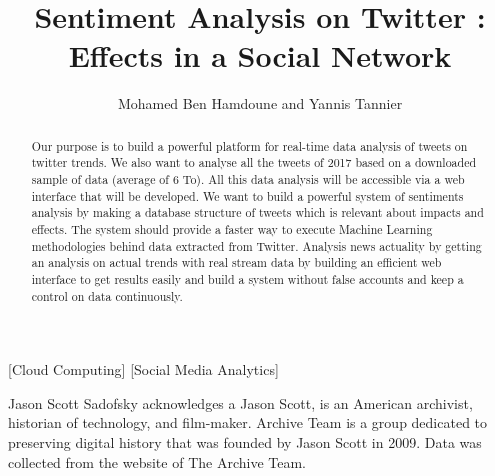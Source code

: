 \documentclass{acmtog} %
\begin{document}

\title{Sentiment Analysis on Twitter : Effects in a Social Network} %

\author{Mohamed Ben Hamdoune {\upshape and} Yannis Tannier
}

[Cloud Computing]
[Social Media Analytics]




\maketitle

\begin{bottomstuff}
Jason Scott Sadofsky acknowledges a Jason Scott, is an American archivist, historian of technology, and film-maker. Archive Team is a group dedicated to preserving digital history that was founded by Jason Scott in 2009. Data was collected from the website of The Archive Team.

\end{bottomstuff}


\begin{abstract}

Our purpose is to build a powerful platform for real-time data analysis of tweets on twitter trends. We also want to analyse all the tweets of 2017 based on a downloaded sample of data (average of 6 To). All this data analysis will be accessible via a web interface that will be developed. We want to build a powerful system of sentiments analysis by making a database structure of tweets which is relevant about impacts and effects. The system should provide a faster way to execute Machine Learning methodologies behind data extracted from Twitter. Analysis news actuality by getting an analysis on actual trends with real stream data by building an efficient web interface to get results easily and build a system without false accounts and keep a control on data continuously.
\end{abstract}
\end{document}
